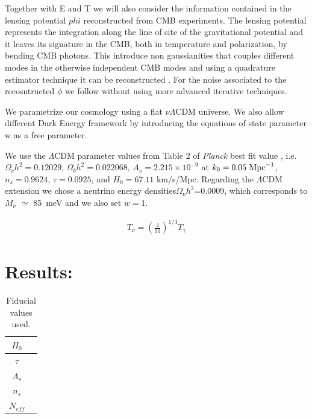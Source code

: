 \documentclass[aps,prd,preprint,groupedaddress]{revtex4-1}
\begin{document}
Together with E and T we will also consider the information contained in the  
lensing potential $phi$ reconstructed from CMB experiments. The lensing potential represents the integration along the line of site of the gravitational potential and it leaves its signature in the CMB, both in temperature and polarization, by bending CMB photons. This introduce non gaussianities that couples different modes in the otherwise independent CMB modes and using a quadrature estimator technique it can be reconstructed \cite{okamoto:2003,hu:2002}.
For the noise associated to the recosntructed $\phi$ we follow \cite{okamoto:2003,hu:2002} without using more advanced iterative techniques.

We parametrize our cosmology using a flat $\nu \Lambda$CDM universe. We also allow different Dark Energy framework by introducing the equations of state parameter w as a free parameter.

We use the $\Lambda$CDM parameter values from Table 2 of \textit{Planck} best fit value \cite{planck-collaboration:2014g}, i.e. $\Omega_c h^2 =  0.12029$,  $\Omega_b h^2  = 0.022068$, $A_s = 2.215\times10^{-9}$ at $k_0 = 0.05\ {\rm Mpc}^{-1}$, $n_s = 0.9624$, $\tau = 0.0925$, and $H_0 = 67.11$ km/s/Mpc. Regarding the $\Lambda$CDM extension we chose a neutrino energy densities$\Omega_{\nu} h^2$=0.0009, which corresponds to $M_{\nu}$  $\simeq$ 85\ meV and we also set $w=1$.


%



\begin{eqnarray}
	T_{\nu} = \left( \frac{4}{11} \right)^{1/3} T_{\gamma} 
	\label{eq:tnu_propto_tgamma}
\end{eqnarray}

\section{Results: \label{sec:results}}

\begin{table}[htdp]
\caption{Fiducial values used.}
\begin{center}
\begin{tabular}{|c|c|}
\hline
$H_{0}$ &\\
\hline
\hline
$\tau$ &  \\
\hline

\hline
$A_{s}$ & \\
\hline

\hline
$n_{s}$ & \\
\hline

\hline
$N_{eff}$ & \\
\hline
\end{tabular}
\end{center}
\label{default}
\end{table}%
\end{document}
